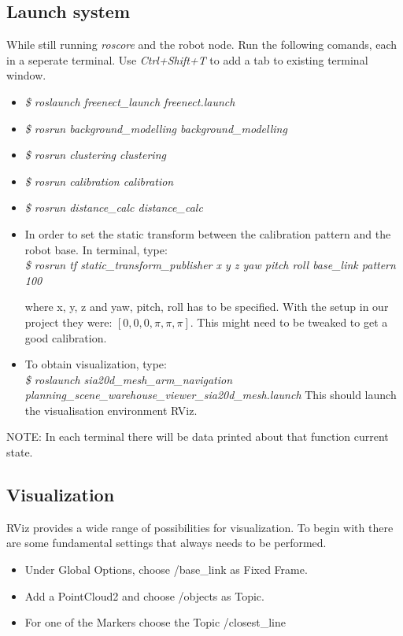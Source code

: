 \documentclass[10pt,a4paper]{article}
\begin{document}
\subsection{Launch system}
While still running \textit{roscore} and the robot node. Run the following comands, each in a seperate terminal.
Use \textit{Ctrl+Shift+T} to add a tab to existing terminal window.
\begin{itemize}
\item \textit{\$ roslaunch freenect\_launch freenect.launch}

\item \textit{\$ rosrun background\_modelling background\_modelling}

\item \textit{\$ rosrun clustering clustering}

\item \textit{\$ rosrun calibration calibration}

\item \textit{\$ rosrun distance\_calc distance\_calc}

\item In order to set the static transform between the calibration pattern and the robot base. In terminal, type:\\
 \textit{\$ rosrun tf static\_transform\_publisher x y z yaw pitch roll base\_link pattern 100}
 
where x, y, z and yaw, pitch, roll has to be specified. With the setup in our project they were: $\left[0, 0, 0, \pi, \pi, \pi \right].$ This might need to be tweaked to get a good calibration.

\item To obtain visualization, type:\\
\textit{\$ roslaunch sia20d\_mesh\_arm\_navigation planning\_scene\_warehouse\_viewer\_sia20d\_mesh.launch}
This should launch the visualisation environment RViz.

\end{itemize}
NOTE: In each terminal there will be data printed about that function current state.

\subsection{Visualization}
RViz provides a wide range of possibilities for visualization.
To begin with there are some fundamental settings that always needs to be performed.
\begin{itemize}

\item Under Global Options, choose /base\_link as Fixed Frame.

\item Add a PointCloud2 and choose /objects as Topic.

\item For one of the Markers choose the Topic /closest\_line
\end{itemize}
\end{document}
